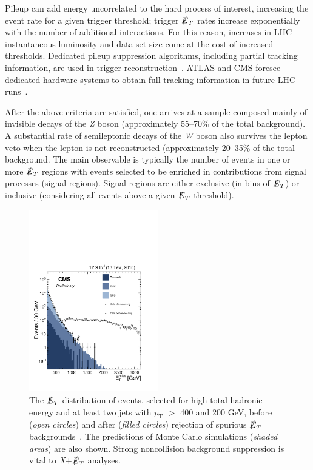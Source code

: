 \documentclass{ar-1col}
\newcommand{\pt}{\ensuremath{p_\mathrm{T}}\xspace}
\newcommand{\MET}{\ensuremath{\slashed{E}_T}\xspace}
\providecommand{\DIFadd}[1]{{\protect\color{blue}\uwave{#1}}} %
\providecommand{\DIFaddFL}[1]{\DIFadd{#1}} %
\providecommand{\DIFaddbeginFL}{} %
\providecommand{\DIFaddendFL}{} %
\begin{document}
{\begin{textbox}
Pileup can add energy uncorrelated to the hard process of interest, increasing the event
rate for a given trigger threshold; trigger \MET rates increase
exponentially with the number of additional interactions. For this
reason, increases in LHC instantaneous luminosity and data set size
come at the cost of increased thresholds. Dedicated pileup
suppression algorithms, including partial tracking information, are
used in trigger
reconstruction~\cite{CMS:2014ata,ATLAS-CONF-2014-019}. ATLAS and
CMS foresee dedicated hardware systems to obtain full tracking
information in future LHC
runs~\cite{Shochet:2013gaw,1748-0221-6-12-C12065}.
\end{textbox}

After the above criteria are satisfied, one arrives at a sample composed mainly
of invisible decays of the \textit{Z} boson (approximately 55--70\% of the
total background). A substantial rate of semileptonic decays of
the \textit{W} boson also survives the lepton veto when the lepton is not
reconstructed (approximately 20--35\% of the total background.
The main observable is typically the number of events in one or
more \MET regions with events selected to be enriched in contributions from signal processes (signal regions). 
Signal regions are either exclusive (in bins of
\MET) or inclusive (considering all events above a given \MET
threshold).

\begin{figure}[!htpb]
\DIFaddbeginFL \includegraphics[width=0.5\textwidth]{figs_standalone/FakeMET}
\DIFaddendFL \caption{The \MET distribution of events, \DIFaddbeginFL \DIFaddFL{termed as $E_T^{miss}$ in the x axis, }\DIFaddendFL selected for high total
hadronic energy and at least two jets with \pt{} $>$ 400 and 200
GeV, before (\textit{open circles}) and after (\textit{filled circles}) rejection of
spurious \MET backgrounds~\cite{CMS-PAS-JME-16-004}. The
predictions of Monte Carlo  simulations (\textit{shaded areas}) are also shown. Strong
noncollision background suppression is vital to \textit{X}+\MET analyses.}
\label{fig:fakeMET}
\end{figure}

}
\end{document}
